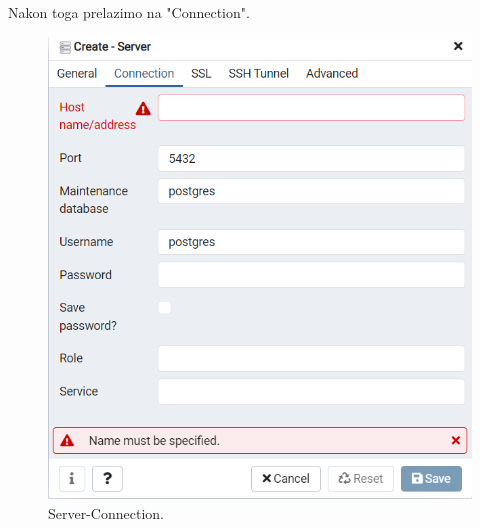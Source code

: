 			 Nakon toga prelazimo na "Connection". 
			 
			 \begin{figure}[H]
			 	\includegraphics[scale=1]{slike/server connection.png} 
			 	\centering
			 	\caption{ Server-Connection.}
			 	\label{DS}
			 \end{figure}
			 
